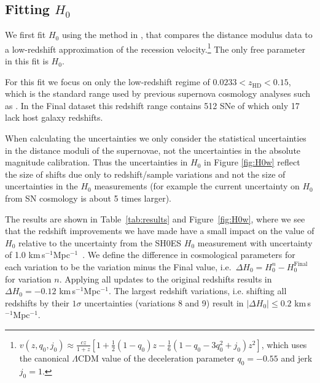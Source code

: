 \documentclass[
  journal=pasa,
  manuscript=research-paper,
  year=2022,
]{cup-journal}
\newcommand{\zHD}[1]{\ensuremath{z_{\text{HD}}^{\mathrm{#1}}}}
\newcommand{\kmsMpc}{km\,s$^{-1}$Mpc$^{-1}$}
\begin{document}
\subsection{Fitting $H_0$}\label{subsec:H0}
We first fit $H_0$ using the method in \citet{Riess2016}, that compares the distance modulus data to a low-redshift approximation of the recession velocity.\footnote{$v(z,q_0,j_0)\approx \frac{cz}{1+z}\left[1+\frac{1}{2}(1-q_0)z-\frac{1}{6}(1-q_0-3q_0^2+j_0)z^2\right]$, which uses the canonical $\Lambda$CDM value of the deceleration parameter $q_0=-0.55$ and jerk $j_0=1$.}
The only free parameter in this fit is $H_0$.

For this fit we focus on only the low-redshift regime of $0.0233<\zHD{}<0.15$, which is the standard range used by previous supernova cosmology analyses such as \citet{Riess2016,Riess2018}.
In the Final dataset this redshift range contains 512 SNe of which only 17 lack host galaxy redshifts.

When calculating the uncertainties we only consider the statistical uncertainties in the distance moduli of the supernovae, not the uncertainties in the absolute magnitude calibration.
Thus the uncertainties in $H_0$ in Figure \ref{fig:H0w} reflect the size of shifts due only to redshift/sample variations and not the size of uncertainties in the $H_0$ measurements (for example the current uncertainty on $H_0$ from SN cosmology is about 5 times larger). 

The results are shown in Table~\ref{tab:results} and Figure~\ref{fig:H0w}, where we see that the redshift improvements we have made have a small impact on the value of $H_0$ relative to the uncertainty from the SH0ES $H_0$ measurement with uncertainty of 1.0 \kmsMpc\ \citep{Riess2022}. 
We define the difference in cosmological parameters for each variation to be the variation minus the Final value, i.e.~$\Delta H_0 = H_0^n - H_0^{\text{Final}}$ for variation $n$.  
Applying all updates to the original redshifts results in $\Delta H_0 = -0.12$ \kmsMpc{}.
The largest redshift variations, i.e. shifting all redshifts by their $1\sigma$ uncertainties (variations 8 and 9) result in $|\Delta H_0|\leq0.2$ \kmsMpc.
\end{document}
